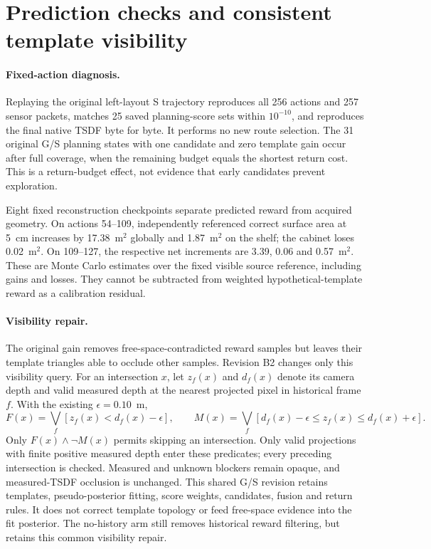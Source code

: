 \clearpage
\section{Prediction checks and consistent template visibility}
\label{sec:visibility-repair}

\paragraph{Fixed-action diagnosis.}
Replaying the original left-layout S trajectory reproduces all 256 actions and 257 sensor packets, matches 25 saved planning-score sets within $10^{-10}$, and reproduces the final native TSDF byte for byte. It performs no new route selection. The 31 original G/S planning states with one candidate and zero template gain occur after full coverage, when the remaining budget equals the shortest return cost. This is a return-budget effect, not evidence that early candidates prevent exploration.

Eight fixed reconstruction checkpoints separate predicted reward from acquired geometry. On actions 54--109, independently referenced correct surface area at 5~cm increases by 17.38~m$^2$ globally and 1.87~m$^2$ on the shelf; the cabinet loses 0.02~m$^2$. On 109--127, the respective net increments are 3.39, 0.06 and 0.57~m$^2$. These are Monte Carlo estimates over the fixed visible source reference, including gains and losses. They cannot be subtracted from weighted hypothetical-template reward as a calibration residual.

\paragraph{Visibility repair.}
The original gain removes free-space-contradicted reward samples but leaves their template triangles able to occlude other samples. Revision B2 changes only this visibility query. For an intersection $x$, let $z_f(x)$ and $d_f(x)$ denote its camera depth and valid measured depth at the nearest projected pixel in historical frame $f$. With the existing $\epsilon=0.10$~m,
\[
 F(x)=\bigvee_f[z_f(x)<d_f(x)-\epsilon],\qquad
 M(x)=\bigvee_f[d_f(x)-\epsilon\le z_f(x)\le d_f(x)+\epsilon].
\]
Only $F(x)\land\neg M(x)$ permits skipping an intersection. Only valid projections with finite positive measured depth enter these predicates; every preceding intersection is checked. Measured and unknown blockers remain opaque, and measured-TSDF occlusion is unchanged. This shared G/S revision retains templates, pseudo-posterior fitting, score weights, candidates, fusion and return rules. It does not correct template topology or feed free-space evidence into the fit posterior. The no-history arm still removes historical reward filtering, but retains this common visibility repair.

